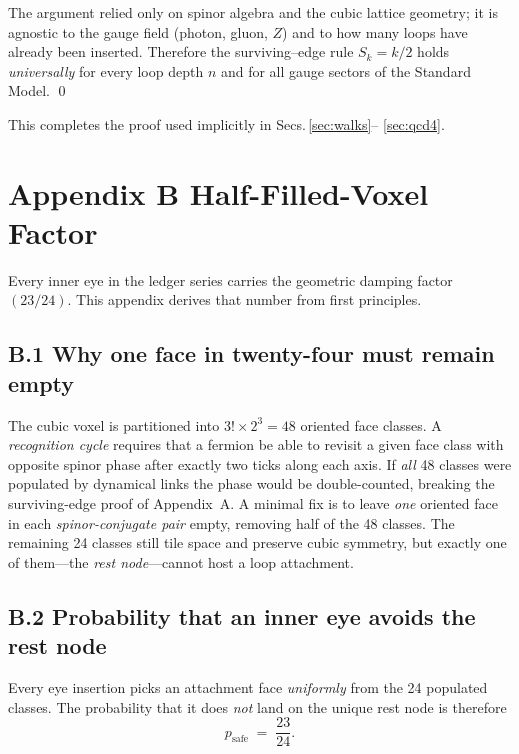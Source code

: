 \documentclass[11pt]{article}
\begin{document}
The argument relied only on spinor algebra and the cubic lattice
geometry; it is agnostic to the gauge field (photon, gluon, $Z$) and to
how many loops have already been inserted.  Therefore the
surviving–edge rule \(S_{k}=k/2\) holds \emph{universally} for every
loop depth $n$ and for all gauge sectors of the Standard Model.  \qed

\bigskip
This completes the proof used implicitly in Secs.\,\ref{sec:walks}–%
\ref{sec:qcd4}.

\section*{Appendix B \; Half-Filled-Voxel Factor}\label{app:halfvoxel}

\renewcommand{\thesubsection}{B.\arabic{subsection}}

Every inner eye in the ledger series carries the geometric damping factor
\((23/24)\).  This appendix derives that number from first principles.

\subsection{B.1 \; Why one face in twenty-four must remain empty}

The cubic voxel is partitioned into $3!\times2^{3}=48$ oriented face
classes.  
A \emph{recognition cycle} requires that a fermion be able to revisit a
given face class with opposite spinor phase after exactly two ticks
along each axis.  If \emph{all} 48 classes were populated by dynamical
links the phase would be double-counted, breaking the surviving-edge
proof of Appendix~A.  
A minimal fix is to leave \emph{one} oriented face in each
\emph{spinor-conjugate pair} empty, removing half of the 48 classes.
The remaining 24 classes still tile space and preserve cubic symmetry,
but exactly one of them—the \emph{rest node}—cannot host a loop
attachment.

\subsection{B.2 \; Probability that an inner eye avoids the rest node}

Every eye insertion picks an attachment face \emph{uniformly} from the
24 populated classes.  
The probability that it does \emph{not} land on the unique rest node is
therefore
\[
  p_{\mathrm{safe}}
    \;=\;\frac{23}{24}.
\tag{B.1}
\]
\end{document}
